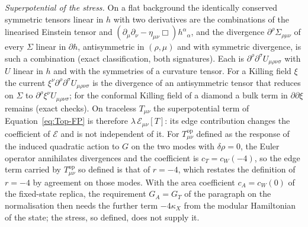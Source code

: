 \emph{Superpotential of the stress.} On a flat background the identically conserved symmetric tensors linear in \(h\) with two derivatives are the combinations of the linearised Einstein tensor and \((\partial_\mu\partial_\nu-\eta_{\mu\nu}\Box)h^\alpha{}_\alpha\), and the divergence \(\partial^\rho\Sigma_{\rho\mu\nu}\) of every \(\Sigma\) linear in \(\partial h\), antisymmetric in \((\rho,\mu)\) and with symmetric divergence, is such a combination (exact classification, both signatures). Each is \(\partial^\rho\partial^\sigma U_{\mu\rho\nu\sigma}\) with \(U\) linear in \(h\) and with the symmetries of a curvature tensor. For a Killing field \(\xi\) the current \(\xi^\nu\partial^\rho\partial^\sigma U_{\mu\rho\nu\sigma}\) is the divergence of an antisymmetric tensor that reduces on \(\Sigma\) to \(\partial^\rho\xi^\nu U_{\mu\rho\nu\sigma}\); for the conformal Killing field of a diamond a bulk term in \(\partial\partial\xi\) remains (exact checks). On traceless \(T_{\mu\nu}\) the superpotential term of Equation~\eqref{eq:Top-FP} is therefore \(\lambda\,\mathcal E_{\mu\nu}[T]\): its edge contribution changes the coefficient of \(\mathcal E\) and is not independent of it. For \(T^{\mathrm{op}}_{\mu\nu}\) defined as the response of the induced quadratic action to \(G\) on the two modes with \(\delta\rho=0\), the Euler operator annihilates divergences and the coefficient is \(c_T=c_W(-4)\), so the edge term carried by \(T^{\mathrm{op}}_{\mu\nu}\) so defined is that of \(r=-4\), which restates the definition of \(r=-4\) by agreement on those modes. With the area coefficient \(c_A=c_W(0)\) of the fixed-state replica, the requirement \(G_A=G_T\) of the paragraph on the normalisation then needs the further term \(-4\kappa_X\) from the modular Hamiltonian of the state; the stress, so defined, does not supply it.

